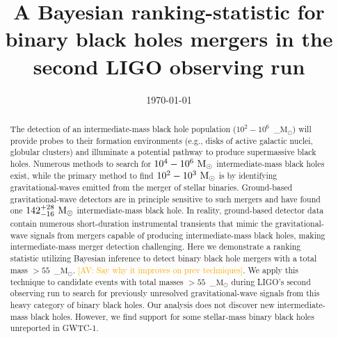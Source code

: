 \documentclass[%
 nofootinbib,
 amsmath,amssymb,
 aps,
 twocolumn,
 superscriptaddress
]{revtex4-2}
\newcommand{\mathcmd}[1]{{\sc \relax\ifmmode#1\else $#1$\fi}\xspace}
\newcommand{\msun}{\mathcmd{\text{M}_\odot}}
\newcommand{\avi}[1]{\textcolor{orange}{[AV: #1]}}
\begin{document}
\title{A Bayesian ranking-statistic for binary black holes mergers in the second LIGO observing run}




\date{\today}


\begin{abstract}
The detection of an intermediate-mass black hole population ($10^2-10^6$~\msun) will provide probes to their formation environments (e.g., disks of active galactic nuclei, globular clusters) and illuminate a potential pathway to produce supermassive black holes. Numerous methods to search for $10^4-10^6\ \msun$ intermediate-mass black holes exist, while the primary method to find $10^2-10^3\ \msun$ is by identifying gravitational-waves emitted from the merger of stellar binaries. Ground-based gravitational-wave detectors are in principle sensitive to such mergers and have found one $142^{+28}_{-16}\ \msun$ intermediate-mass black hole. In reality, ground-based detector data contain numerous short-duration instrumental transients that mimic the gravitational-wave signals from mergers capable of producing intermediate-mass black holes, making intermediate-mass merger detection challenging. Here we demonstrate a ranking statistic utilizing Bayesian inference to detect binary black hole mergers with a total mass $>55$~\msun. \avi{Say why it improves on prev techniques}. We apply this technique to candidate events with total masses $>55$~\msun during LIGO's second observing run to search for previously unresolved gravitational-wave signals from this heavy category of binary black holes. Our analysis does not discover new intermediate-mass black holes. However, we find support for some stellar-mass binary black holes unreported in GWTC-1.
\end{abstract}


\maketitle

\end{document}
